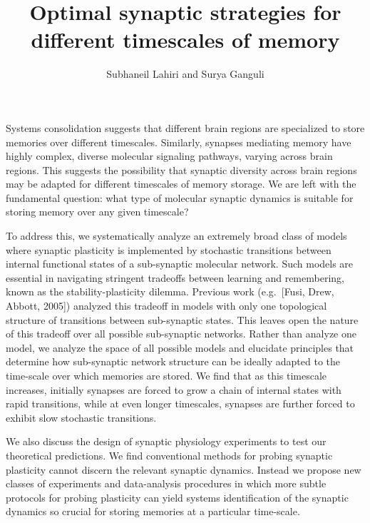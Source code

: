 \documentclass[12pt]{article}
\title{Optimal synaptic strategies for different timescales of memory}
\author{Subhaneil Lahiri and Surya Ganguli}
\date{}
\begin{document}
\pagestyle{empty}
\maketitle
\thispagestyle{empty}


Systems consolidation suggests that different brain regions are specialized to store memories over different timescales. Similarly, synapses mediating memory have highly complex, diverse molecular signaling pathways, varying across brain regions. This suggests the possibility that synaptic diversity across brain regions may be adapted for different timescales of memory storage. We are left with the fundamental question: what type of molecular synaptic dynamics is suitable for storing memory over any given timescale?

To address this, we systematically analyze an extremely broad class of models where synaptic plasticity is implemented by stochastic transitions between internal functional states of a sub-synaptic molecular network. Such models are essential in navigating stringent tradeoffs between learning and remembering, known as the stability-plasticity dilemma. Previous work (e.g.\ [Fusi, Drew, Abbott, 2005]) analyzed this tradeoff in models with only one topological structure of transitions between sub-synaptic states.  This leaves open the nature of this tradeoff over all possible sub-synaptic networks.  Rather than analyze one model, we analyze the space of all possible models and elucidate principles that determine how sub-synaptic network structure can be ideally adapted to the time-scale over which memories are stored.  We find that as this timescale increases, initially synapses are forced to grow a chain of internal states with rapid transitions, while at even longer timescales, synapses are further forced to exhibit slow stochastic transitions.

We also discuss the design of synaptic physiology experiments to test our theoretical predictions.  We find conventional methods for probing synaptic plasticity cannot discern the relevant synaptic dynamics.  Instead we propose new classes of experiments and data-analysis procedures in which more subtle protocols for probing plasticity can yield systems identification of the synaptic dynamics so crucial for storing memories at a particular time-scale.
\end{document}
